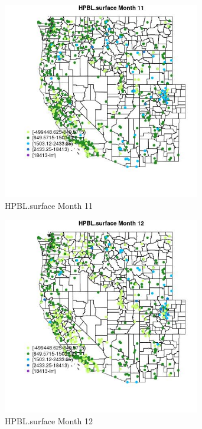 \begin{figure} 
\centering  
\includegraphics[width=0.77\textwidth]{Code_Outputs/Report_ML_input_PM25_Step4_part_e_de_duplicated_aves_compiled_2019-05-21wNAs_MapObsMo11HPBLsurface.jpg} 
\caption{\label{fig:Report_ML_input_PM25_Step4_part_e_de_duplicated_aves_compiled_2019-05-21wNAsMapObsMo11HPBLsurface}HPBL.surface Month 11} 
\end{figure} 
 

\clearpage 

\begin{figure} 
\centering  
\includegraphics[width=0.77\textwidth]{Code_Outputs/Report_ML_input_PM25_Step4_part_e_de_duplicated_aves_compiled_2019-05-21wNAs_MapObsMo12HPBLsurface.jpg} 
\caption{\label{fig:Report_ML_input_PM25_Step4_part_e_de_duplicated_aves_compiled_2019-05-21wNAsMapObsMo12HPBLsurface}HPBL.surface Month 12} 
\end{figure} 
 

